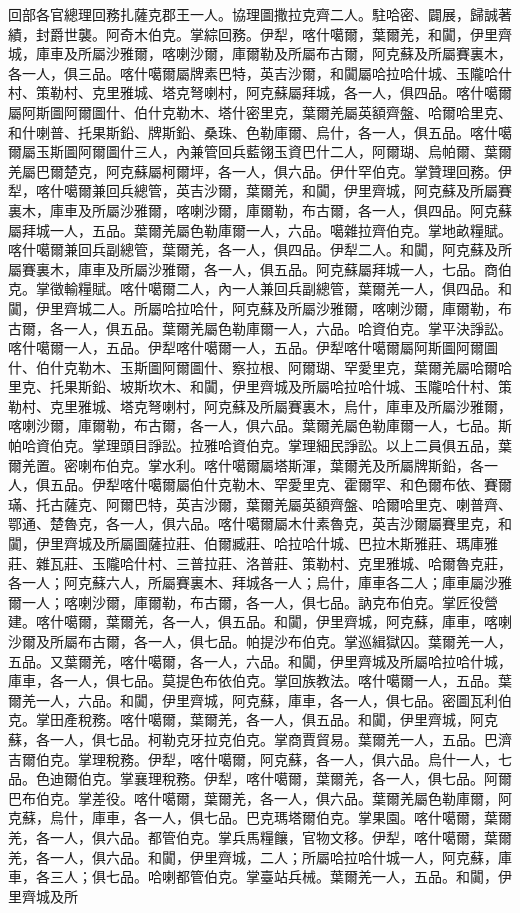 \begin{pinyinscope}
回部各官總理回務扎薩克郡王一人。協理圖撒拉克齊二人。駐哈密、闢展，歸誠著績，封爵世襲。阿奇木伯克。掌綜回務。伊犁，喀什噶爾，葉爾羌，和闐，伊里齊城，庫車及所屬沙雅爾，喀喇沙爾，庫爾勒及所屬布古爾，阿克蘇及所屬賽裏木，各一人，俱三品。喀什噶爾屬牌素巴特，英吉沙爾，和闐屬哈拉哈什城、玉隴哈什村、策勒村、克里雅城、塔克弩喇村，阿克蘇屬拜城，各一人，俱四品。喀什噶爾屬阿斯圖阿爾圖什、伯什克勒木、塔什密里克，葉爾羌屬英額齊盤、哈爾哈里克、和什喇普、托果斯鉛、牌斯鉛、桑珠、色勒庫爾、烏什，各一人，俱五品。喀什噶爾屬玉斯圖阿爾圖什三人，內兼管回兵藍翎玉資巴什二人，阿爾瑚、烏帕爾、葉爾羌屬巴爾楚克，阿克蘇屬柯爾坪，各一人，俱六品。伊什罕伯克。掌贊理回務。伊犁，喀什噶爾兼回兵總管，英吉沙爾，葉爾羌，和闐，伊里齊城，阿克蘇及所屬賽裏木，庫車及所屬沙雅爾，喀喇沙爾，庫爾勒，布古爾，各一人，俱四品。阿克蘇屬拜城一人，五品。葉爾羌屬色勒庫爾一人，六品。噶雜拉齊伯克。掌地畝糧賦。喀什噶爾兼回兵副總管，葉爾羌，各一人，俱四品。伊犁二人。和闐，阿克蘇及所屬賽裏木，庫車及所屬沙雅爾，各一人，俱五品。阿克蘇屬拜城一人，七品。商伯克。掌徵輸糧賦。喀什噶爾二人，內一人兼回兵副總管，葉爾羌一人，俱四品。和闐，伊里齊城二人。所屬哈拉哈什，阿克蘇及所屬沙雅爾，喀喇沙爾，庫爾勒，布古爾，各一人，俱五品。葉爾羌屬色勒庫爾一人，六品。哈資伯克。掌平決諍訟。喀什噶爾一人，五品。伊犁喀什噶爾一人，五品。伊犁喀什噶爾屬阿斯圖阿爾圖什、伯什克勒木、玉斯圖阿爾圖什、察拉根、阿爾瑚、罕愛里克，葉爾羌屬哈爾哈里克、托果斯鉛、坡斯坎木、和闐，伊里齊城及所屬哈拉哈什城、玉隴哈什村、策勒村、克里雅城、塔克弩喇村，阿克蘇及所屬賽裏木，烏什，庫車及所屬沙雅爾，喀喇沙爾，庫爾勒，布古爾，各一人，俱六品。葉爾羌屬色勒庫爾一人，七品。斯帕哈資伯克。掌理頭目諍訟。拉雅哈資伯克。掌理細民諍訟。以上二員俱五品，葉爾羌置。密喇布伯克。掌水利。喀什噶爾屬塔斯渾，葉爾羌及所屬牌斯鉛，各一人，俱五品。伊犁喀什噶爾屬伯什克勒木、罕愛里克、霍爾罕、和色爾布依、賽爾璊、托古薩克、阿爾巴特，英吉沙爾，葉爾羌屬英額齊盤、哈爾哈里克、喇普齊、鄂通、楚魯克，各一人，俱六品。喀什噶爾屬木什素魯克，英吉沙爾屬賽里克，和闐，伊里齊城及所屬圖薩拉莊、伯爾臧莊、哈拉哈什城、巴拉木斯雅莊、瑪庫雅莊、雜瓦莊、玉隴哈什村、三普拉莊、洛普莊、策勒村、克里雅城、哈爾魯克莊，各一人；阿克蘇六人，所屬賽裏木、拜城各一人；烏什，庫車各二人；庫車屬沙雅爾一人；喀喇沙爾，庫爾勒，布古爾，各一人，俱七品。訥克布伯克。掌匠役營建。喀什噶爾，葉爾羌，各一人，俱五品。和闐，伊里齊城，阿克蘇，庫車，喀喇沙爾及所屬布古爾，各一人，俱七品。帕提沙布伯克。掌巡緝獄囚。葉爾羌一人，五品。又葉爾羌，喀什噶爾，各一人，六品。和闐，伊里齊城及所屬哈拉哈什城，庫車，各一人，俱七品。莫提色布依伯克。掌回族教法。喀什噶爾一人，五品。葉爾羌一人，六品。和闐，伊里齊城，阿克蘇，庫車，各一人，俱七品。密圖瓦利伯克。掌田產稅務。喀什噶爾，葉爾羌，各一人，俱五品。和闐，伊里齊城，阿克蘇，各一人，俱七品。柯勒克牙拉克伯克。掌商賈貿易。葉爾羌一人，五品。巴濟吉爾伯克。掌理稅務。伊犁，喀什噶爾，阿克蘇，各一人，俱六品。烏什一人，七品。色迪爾伯克。掌襄理稅務。伊犁，喀什噶爾，葉爾羌，各一人，俱七品。阿爾巴布伯克。掌差役。喀什噶爾，葉爾羌，各一人，俱六品。葉爾羌屬色勒庫爾，阿克蘇，烏什，庫車，各一人，俱七品。巴克瑪塔爾伯克。掌果園。喀什噶爾，葉爾羌，各一人，俱六品。都管伯克。掌兵馬糧饟，官物文移。伊犁，喀什噶爾，葉爾羌，各一人，俱六品。和闐，伊里齊城，二人；所屬哈拉哈什城一人，阿克蘇，庫車，各三人；俱七品。哈喇都管伯克。掌臺站兵械。葉爾羌一人，五品。和闐，伊里齊城及所
\end{pinyinscope}

